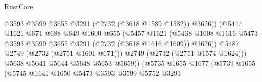 \begin{lexlean}{RustCore}
\begin{coremodule}
                                                @3593
                                                @3599
                                                @3655
                                                @3291
                                                (@2732 (@3618 @1589 @1582))
                                                @3626))
                                            (@5447
                                              @1621
                                              @671
                                              @688
                                              @649
                                              @1600
                                              @655
                                              (@5457
                                                @1621
                                                (@5468
                                                  @1608
                                                  @1616
                                                  @5473
                                                  @3593
                                                  @3599
                                                  @3655
                                                  @3291
                                                  (@2732 (@3618 @1616 @1609))
                                                  @3626))
                                              @5487
                                              @2749
                                              (@2732 (@2751 @1601 @671)))
                                            @2749
                                            (@2732 (@2751 @1574 @1624)))
                                          @5638
                                          @5641
                                          @5644
                                          @5648
                                          @5653
                                          @5659))
                                      (@5735
                                        @1655
                                        @1677
                                        (@5739
                                          @1655
                                          (@5745
                                            @1641
                                            @1650
                                            @5473
                                            @3593
                                            @3599
                                            @5752
                                            @3291

\end{coremodule}
\end{lexlean}

